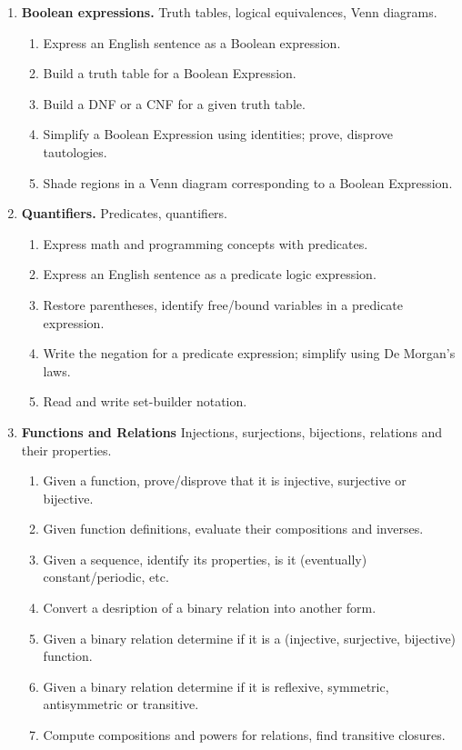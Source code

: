 \documentclass[a4paper,12pt]{article}
\begin{document}
{\small
\begin{enumerate}

\item \textbf{Boolean expressions.} Truth tables, logical equivalences, Venn diagrams.
\begin{enumerate}
\item Express an English sentence as a Boolean expression.
\item Build a truth table for a Boolean Expression.
\item Build a DNF or a CNF for a given truth table.
\item Simplify a Boolean Expression using identities; prove, disprove tautologies.
\item Shade regions in a Venn diagram corresponding to a Boolean Expression.
\end{enumerate}
\item \textbf{Quantifiers.} Predicates, quantifiers.
\begin{enumerate}
\item Express math and programming concepts with predicates.
\item Express an English sentence as a predicate logic expression.
\item Restore parentheses, identify free/bound variables in a predicate expression.
\item Write the negation for a predicate expression; simplify using De Morgan's laws.
\item Read and write set-builder notation.
\end{enumerate}
\item \textbf{Functions and Relations} Injections, surjections, bijections, relations and their properties.
\begin{enumerate}
\item Given a function, prove/disprove that it is injective, surjective or bijective.
\item Given function definitions, evaluate their compositions and inverses.
\item Given a sequence, identify its properties, is it (eventually) constant/periodic, etc.
\item Convert a desription of a binary relation into another form.
\item Given a binary relation determine if it is a (injective, surjective, bijective) function.
\item Given a binary relation determine if it is reflexive, symmetric, antisymmetric or transitive.
\item Compute compositions and powers for relations, find transitive closures.

\end{enumerate}
\end{enumerate}}
\end{document}
